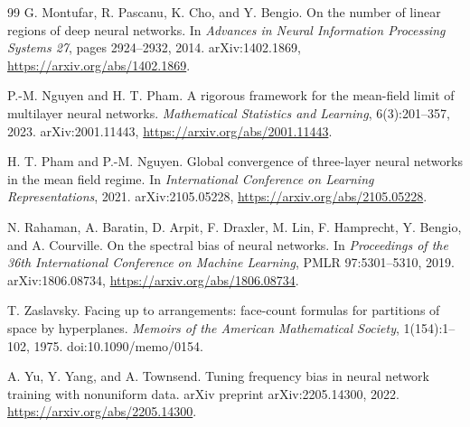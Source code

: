 \documentclass{article}
\begin{document}
\begin{thebibliography}{99}
G. Montufar, R. Pascanu, K. Cho, and Y. Bengio.
\newblock On the number of linear regions of deep neural networks.
\newblock In \emph{Advances in Neural Information Processing Systems 27}, pages 2924--2932, 2014.
\newblock arXiv:1402.1869, \url{https://arxiv.org/abs/1402.1869}.

P.-M. Nguyen and H. T. Pham.
\newblock A rigorous framework for the mean-field limit of multilayer neural networks.
\newblock \emph{Mathematical Statistics and Learning}, 6(3):201--357, 2023.
\newblock arXiv:2001.11443, \url{https://arxiv.org/abs/2001.11443}.

H. T. Pham and P.-M. Nguyen.
\newblock Global convergence of three-layer neural networks in the mean field regime.
\newblock In \emph{International Conference on Learning Representations}, 2021.
\newblock arXiv:2105.05228, \url{https://arxiv.org/abs/2105.05228}.

N. Rahaman, A. Baratin, D. Arpit, F. Draxler, M. Lin, F. Hamprecht, Y. Bengio, and A. Courville.
\newblock On the spectral bias of neural networks.
\newblock In \emph{Proceedings of the 36th International Conference on Machine Learning}, PMLR 97:5301--5310, 2019.
\newblock arXiv:1806.08734, \url{https://arxiv.org/abs/1806.08734}.

T. Zaslavsky.
\newblock Facing up to arrangements: face-count formulas for partitions of space by hyperplanes.
\newblock \emph{Memoirs of the American Mathematical Society}, 1(154):1--102, 1975.
\newblock doi:10.1090/memo/0154.

A. Yu, Y. Yang, and A. Townsend.
\newblock Tuning frequency bias in neural network training with nonuniform data.
\newblock arXiv preprint arXiv:2205.14300, 2022.
\newblock \url{https://arxiv.org/abs/2205.14300}.

\end{thebibliography}

\newpage


\clearpage
\appendix

\end{document}
